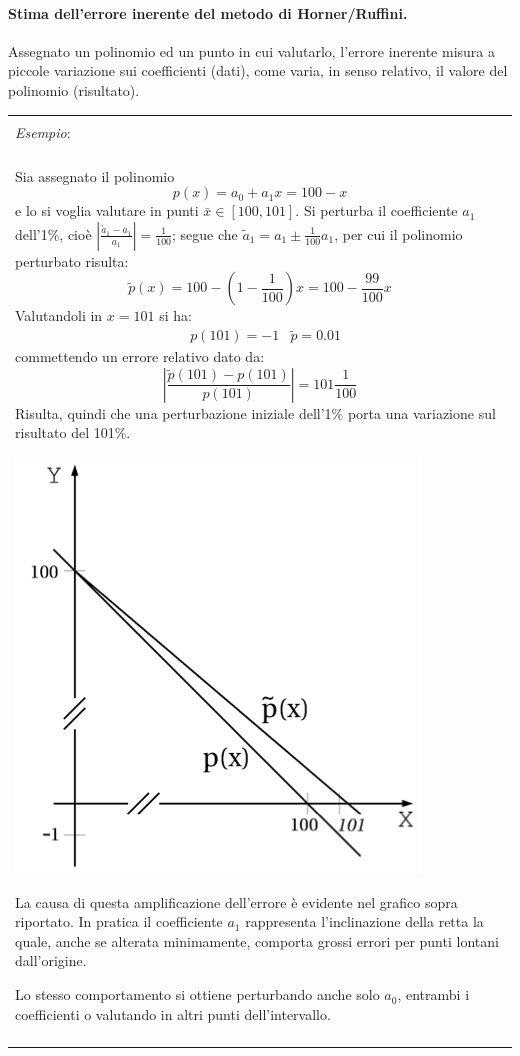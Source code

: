 \documentclass{article}
\numberwithin{equation}{section}
\newenvironment{example}
{\begin{center}
        \begin{tabular}{|p{0.9\textwidth}|}
            \hline \\ 
            \textit{Esempio}: \\\\ 
        }
        {
            \\\\ \hline
        \end{tabular}
    \end{center}
}
\begin{document}
\paragraph{Stima dell'errore inerente del metodo di Horner/Ruffini.} Assegnato
un polinomio ed un punto in cui valutarlo, l'errore inerente misura a piccole
variazione sui coefficienti (dati), come varia, in senso relativo, il valore
del polinomio (risultato). 
\begin{example}
    Sia assegnato il polinomio
    $$p(x)=a_0+a_1x=100-x$$
    e lo si voglia valutare in punti $\bar{x}\in[100,101]$. Si perturba il
    coefficiente $a_1$ dell'1\%, cioè $\left\lvert
    \frac{\tilde{a}_1-a_1}{a_1}\right\rvert=\frac{1}{100}$; segue che
    $\tilde{a}_1=a_1\pm \frac{1}{100}a_1$, per cui il polinomio perturbato
    risulta:
    $$\tilde{p}(x)=100-(1-\frac{1}{100})x=100-\frac{99}{100}x$$
    Valutandoli in $x=101$ si ha:
    \begin{equation*}
       \begin{aligned}
           & p(101)=-1 & \tilde{p}=0.01
       \end{aligned} 
    \end{equation*}
    commettendo un errore relativo dato da:
    $$\left\lvert \frac{\tilde{p}(101)-p(101)}{p(101)}\right\rvert=101\frac{1}{100}$$
    Risulta, quindi che una perturbazione iniziale dell'1\% porta una
    variazione sul risultato del 101\%.
    
    \begin{center}
        \includegraphics[width=0.39\linewidth]{error_amplification}
    \end{center}

    La causa di questa amplificazione dell'errore è evidente nel grafico sopra 
    riportato. In pratica il coefficiente $a_1$ rappresenta l'inclinazione
    della retta la quale, anche se alterata minimamente, comporta grossi
    errori per punti lontani dall'origine. 
    
    Lo stesso comportamento si ottiene perturbando anche solo $a_0$, entrambi
    i coefficienti o valutando in altri punti dell'intervallo.


\end{example}
\end{document}
